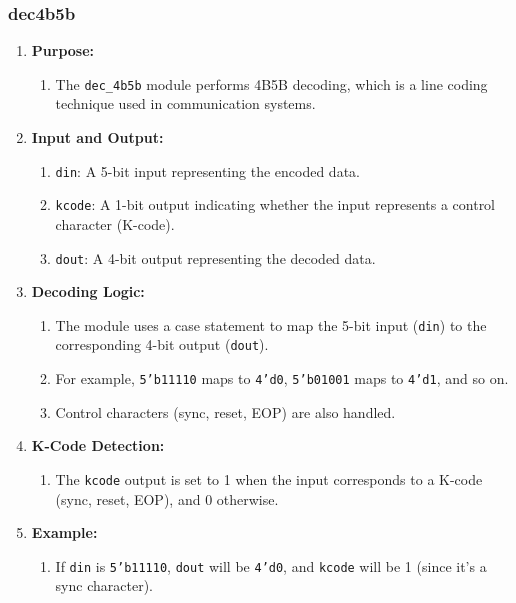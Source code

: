 \subsubsection{dec\textunderscore4b5b}
\begin{enumerate}
    \item \textbf{Purpose:}
    \begin{enumerate}
        \item The \texttt{dec\_4b5b} module performs 4B5B decoding, which is a line coding technique used in communication systems.
    \end{enumerate}

    \item \textbf{Input and Output:}
    \begin{enumerate}
        \item \texttt{din}: A 5-bit input representing the encoded data.
        \item \texttt{kcode}: A 1-bit output indicating whether the input represents a control character (K-code).
        \item \texttt{dout}: A 4-bit output representing the decoded data.
    \end{enumerate}

    \item \textbf{Decoding Logic:}
    \begin{enumerate}
        \item The module uses a case statement to map the 5-bit input (\texttt{din}) to the corresponding 4-bit output (\texttt{dout}).
        \item For example, \texttt{5'b11110} maps to \texttt{4'd0}, \texttt{5'b01001} maps to \texttt{4'd1}, and so on.
        \item Control characters (sync, reset, EOP) are also handled.
    \end{enumerate}

    \item \textbf{K-Code Detection:}
    \begin{enumerate}
        \item The \texttt{kcode} output is set to 1 when the input corresponds to a K-code (sync, reset, EOP), and 0 otherwise.
    \end{enumerate}

    \item \textbf{Example:}
    \begin{enumerate}
        \item If \texttt{din} is \texttt{5'b11110}, \texttt{dout} will be \texttt{4'd0}, and \texttt{kcode} will be 1 (since it’s a sync character).
    \end{enumerate}
\end{enumerate}

